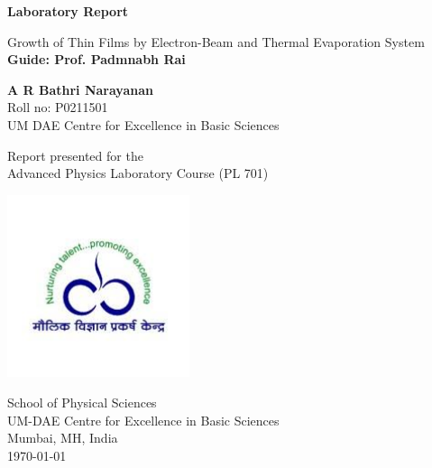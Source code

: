 \begin{titlepage}
	\begin{center}
		\vspace*{1cm}
		
		\Huge
		\textbf{Laboratory Report}
		
		\vspace{0.5cm}
		\LARGE
		Growth of Thin Films by Electron-Beam and Thermal Evaporation System\\
		\vspace{0.5cm}
		\textbf{Guide: Prof. Padmnabh Rai}
		
		\vspace{1.5cm}
		
		\textbf{A R Bathri Narayanan}\\
		Roll no: P0211501\\
		UM DAE Centre for Excellence in Basic Sciences
		
		\vspace{3 cm}
		
		Report presented for the\\
		Advanced Physics Laboratory Course (PL 701)
		
		\vspace{0.8cm}
		
		\includegraphics[width=0.4\textwidth]{cebs.jpg}
		
		\Large
		School of Physical Sciences\\
		UM-DAE Centre for Excellence in Basic Sciences\\
		Mumbai, MH, India\\
		\today
		
	\end{center}
\end{titlepage}